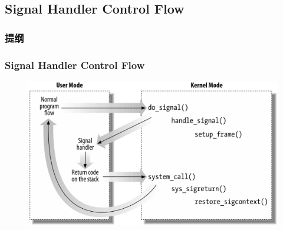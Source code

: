 \subsection{Signal Handler Control Flow} %
\begin{frame}
\frametitle{提纲} %
\tableofcontents %
\end{frame}
\begin{frame}[fragile]
    \frametitle{Signal Handler Control Flow}
    \begin{figure}
	\includegraphics[width=0.8\linewidth]{figs/signal-control-flow.png}
	\end{figure}
\end{frame}
% 
% 
